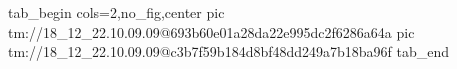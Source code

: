  
 
 
 
 

\qqSecOrig


\ifcmt
  tab_begin cols=2,no_fig,center
    pic tm://18_12_22.10.09.09@693b60e01a28da22e995dc2f6286a64a
    pic tm://18_12_22.10.09.09@c3b7f59b184d8bf48dd249a7b18ba96f
  tab_end
\fi

